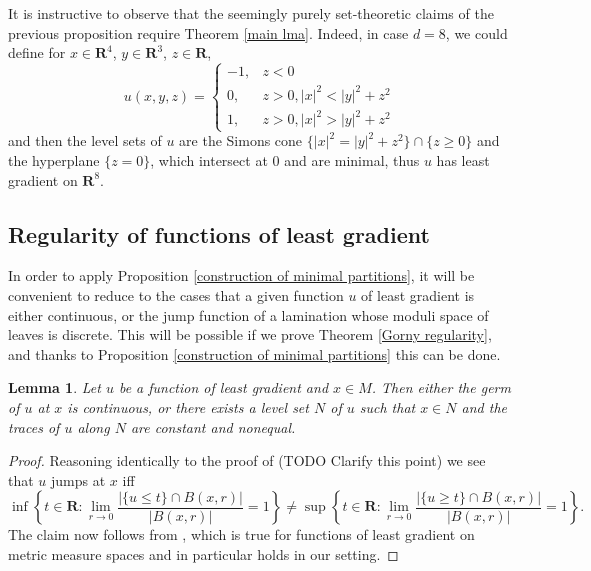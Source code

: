 \documentclass[reqno,10pt]{amsart}
\newcommand{\RR}{\mathbf{R}}
\newtheorem{lemma}[theorem]{Lemma}
\theoremstyle{definition}
\numberwithin{equation}{section}
\begin{document}
It is instructive to observe that the seemingly purely set-theoretic claims of the previous proposition require Theorem \ref{main lma}.
Indeed, in case $d = 8$, we could define for $x \in \RR^4$, $y \in \RR^3$, $z \in \RR$,
$$u(x, y, z) = \begin{cases}
-1, & z < 0 \\
0, & z > 0, |x|^2 < |y|^2 + z^2 \\
1, & z > 0, |x|^2 > |y|^2 + z^2
\end{cases}$$
and then the level sets of $u$ are the Simons cone $\{|x|^2 = |y|^2 + z^2\} \cap \{z \geq 0\}$ and the hyperplane $\{z = 0\}$, which intersect at $0$ and are minimal, thus $u$ has least gradient on $\RR^8$.


\subsection{Regularity of functions of least gradient}
In order to apply Proposition \ref{construction of minimal partitions}, it will be convenient to reduce to the cases that a given function $u$ of least gradient is either continuous, or the jump function of a lamination whose moduli space of leaves is discrete.
This will be possible if we prove Theorem \ref{Gorny regularity}, and thanks to Proposition \ref{construction of minimal partitions} this can be done.

\begin{lemma}
Let $u$ be a function of least gradient and $x \in M$. Then either the germ of $u$ at $x$ is continuous, or there exists a level set $N$ of $u$ such that $x \in N$ and the traces of $u$ along $N$ are constant and nonequal.
\end{lemma}
\begin{proof}
Reasoning identically to the proof of \cite[Proposition 3.9]{górny2017planar} (TODO Clarify this point) we see that $u$ jumps at $x$ iff
$$\inf\left\{t \in \RR: \lim_{r \to 0} \frac{|\{u \leq t\} \cap B(x, r)|}{|B(x, r)|} = 1\right\} \neq \sup\left\{t \in \RR: \lim_{r \to 0} \frac{|\{u \geq t\} \cap B(x, r)|}{|B(x, r)|} = 1\right\}.$$
The claim now follows from \cite[Theorem 4.1]{HakkarainenKorteLahtiShanmugalingam+2015}, which is true for functions of least gradient on metric measure spaces and in particular holds in our setting.
\end{proof}
\end{document}
